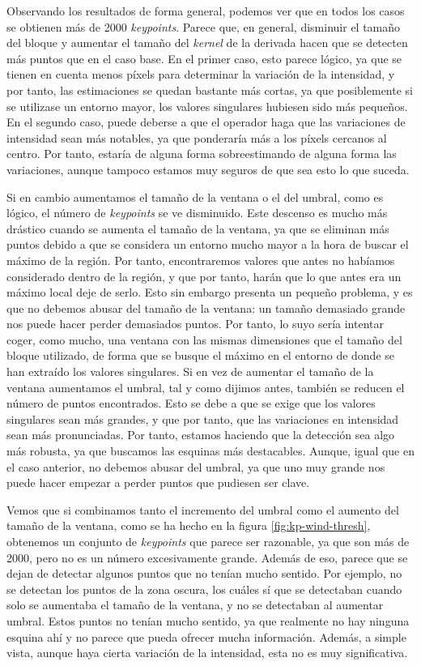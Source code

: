 \documentclass[11pt,a4paper]{article}
\begin{document}
Observando los resultados de forma general, podemos ver que en todos los casos se
obtienen más de 2000 \textit{keypoints}. Parece que, en general, disminuir el tamaño
del bloque y aumentar el tamaño del \textit{kernel} de la derivada hacen que se detecten
más puntos que en el caso base. En el primer caso, esto parece lógico, ya que se tienen en
cuenta menos píxels para determinar la variación de la intensidad, y por tanto, las estimaciones
se quedan bastante más cortas, ya que posiblemente si se utilizase un entorno mayor, los valores
singulares hubiesen sido más pequeños. En el segundo caso, puede deberse a que el operador
haga que las variaciones de intensidad sean más notables, ya que ponderaría más a los píxels
cercanos al centro. Por tanto, estaría de alguna forma sobreestimando de alguna forma las variaciones,
aunque tampoco estamos muy seguros de que sea esto lo que suceda.

Si en cambio aumentamos el tamaño de la ventana o el del umbral, como es lógico, el número
de \textit{keypoints} se ve disminuido. Este descenso es mucho más drástico cuando se aumenta
el tamaño de la ventana, ya que se eliminan más puntos debido a que se considera
un entorno mucho mayor a la hora de buscar el máximo de la región. Por tanto, encontraremos
valores que antes no habíamos considerado dentro de la región, y que por tanto, harán que lo
que antes era un máximo local deje de serlo. Esto sin embargo presenta un pequeño problema, y es
que no debemos abusar del tamaño de la ventana: un tamaño demasiado grande nos puede hacer
perder demasiados puntos. Por tanto, lo suyo sería intentar coger, como mucho, una ventana con las
mismas dimensiones que el tamaño del bloque utilizado, de forma que se busque el máximo en el entorno
de donde se han extraído los valores singulares.  Si en vez de aumentar el tamaño de la ventana
aumentamos el umbral, tal y como dijimos antes, también se reducen el número de puntos encontrados.
Esto se debe a que se exige que los valores singulares sean más grandes, y que por tanto,
que las variaciones en intensidad sean más pronunciadas. Por tanto, estamos haciendo que
la detección sea algo más robusta, ya que buscamos las esquinas más destacables. Aunque,
igual que en el caso anterior, no debemos abusar del umbral, ya que uno muy grande nos puede hacer
empezar a perder puntos que pudiesen ser clave.

Vemos que si combinamos tanto el incremento del umbral como el aumento del tamaño de la
ventana, como se ha hecho en la figura \ref{fig:kp-wind-thresh},  obtenemos un conjunto de
\textit{keypoints} que parece ser razonable, ya que son más de 2000, pero no es un número
excesivamente grande. Además de eso, parece que se dejan de detectar algunos puntos que
no tenían mucho sentido. Por ejemplo, no se detectan los puntos de la zona oscura, los cuáles
sí que se detectaban cuando solo se aumentaba el tamaño de la ventana, y no se detectaban
al aumentar umbral. Estos puntos no tenían mucho sentido, ya que realmente no hay ninguna
esquina ahí y no parece que pueda ofrecer mucha información. Además, a simple vista,
aunque haya cierta variación de la intensidad, esta no es muy significativa.
\end{document}
